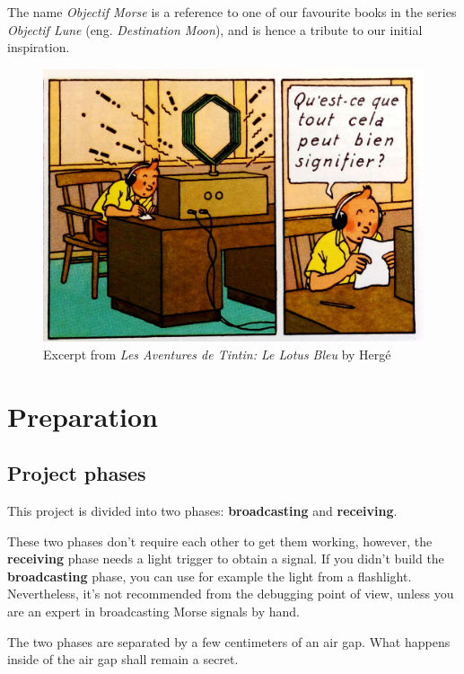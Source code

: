 \documentclass[12pt]{report}
\begin{document}
The name \textit{Objectif Morse} is a reference to one of our favourite books in the series \textit{Objectif Lune} \cite{objectif_lune} (eng. \textit{Destination Moon}), and is hence a tribute to our initial inspiration.

\begin{figure}[H]
\centering\includegraphics[scale=0.1]{le_lotus_bleu}
\caption{Excerpt from \textit{Les Aventures de Tintin: Le Lotus Bleu} by Hergé \cite{le_lotus_bleu}}			
\label{fig:tintin}
\end{figure}


\section{Preparation}

\subsection{Project phases}

This project is divided into two phases: \textbf{broadcasting} and \textbf{receiving}. 

These two phases don't require each other to get them working, however, the \textbf{receiving} phase needs a light trigger to obtain a signal. If you didn't build the  \textbf{broadcasting} phase, you can use for example the light from a flashlight. Nevertheless, it's not recommended from the debugging point of view, unless you are an expert in broadcasting Morse signals by hand.

The two phases are separated by a few centimeters of an air gap. What happens inside of the air gap shall remain a secret.
\end{document}
